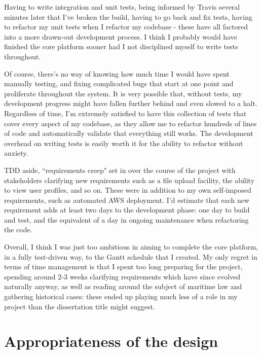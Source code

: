 Having to write integration and unit tests, being informed by Travis several minutes later that I've broken the build, having to go back and fix tests, having to refactor my unit tests when I refactor my codebase - these have all factored into a more drawn-out development process. I think I probably would have finished the core platform sooner had I not disciplined myself to write tests throughout.

Of course, there's no way of knowing how much time I would have spent manually testing, and fixing complicated bugs that start at one point and proliferate throughout the system. It is very possible that, without tests, my development progress might have fallen further behind and even slowed to a halt. Regardless of time, I'm extremely satisfied to have this collection of tests that cover every aspect of my codebase, as they allow me to refactor hundreds of lines of code and automatically validate that everything still works. The development overhead on writing tests is easily worth it for the ability to refactor without anxiety.

TDD aside, ``requirements creep" set in over the course of the project with stakeholders clarifying new requirements such as a file upload facility, the ability to view user profiles, and so on. These were in addition to my own self-imposed requirements, such as automated AWS deployment. I'd estimate that each new requirement adds at least two days to the development phase: one day to build and test, and the equivalent of a day in ongoing maintenance when refactoring the code.

Overall, I think I was just too ambitious in aiming to complete the core platform, in a fully test-driven way, to the Gantt schedule that I created. My only regret in terms of time management is that I spent too long preparing for the project, spending around 2-3 weeks clarifying requirements which have since evolved naturally anyway, as well as reading around the subject of maritime law and gathering historical cases: these ended up playing much less of a role in my project than the dissertation title might suggest.

\section{Appropriateness of the design}



